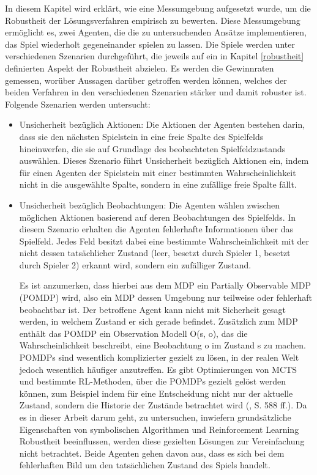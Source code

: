 In diesem Kapitel wird erklärt, wie eine Messumgebung aufgesetzt wurde, um die Robustheit
der Lösungsverfahren empirisch zu bewerten. Diese Messumgebung ermöglicht es, zwei Agenten, die die zu untersuchenden Ansätze implementieren, das Spiel wiederholt gegeneinander spielen zu lassen. Die Spiele werden unter verschiedenen Szenarien durchgeführt, die jeweils auf ein in Kapitel \ref{robustheit} definierten Aspekt der Robustheit abzielen. Es werden die Gewinnraten gemessen, worüber Aussagen darüber getroffen werden können, welches der beiden Verfahren in den verschiedenen Szenarien stärker und damit robuster ist. Folgende Szenarien werden untersucht:

\begin{itemize}
	\item Unsicherheit bezüglich Aktionen: Die Aktionen der Agenten bestehen darin, dass sie den nächsten Spielstein in eine freie Spalte des Spielfelds hineinwerfen, die sie auf Grundlage des beobachteten Spielfeldzustands auswählen. Dieses Szenario führt Unsicherheit bezüglich Aktionen ein, indem für einen Agenten der Spielstein mit einer bestimmten Wahrscheinlichkeit nicht in die ausgewählte Spalte, sondern in eine zufällige freie Spalte fällt.
	
	\item Unsicherheit bezüglich Beobachtungen: Die Agenten wählen zwischen möglichen Aktionen basierend auf deren Beobachtungen des Spielfelds. In diesem Szenario erhalten die Agenten fehlerhafte Informationen über das Spielfeld. Jedes Feld besitzt dabei eine bestimmte Wahrscheinlichkeit mit der nicht dessen tatsächlicher Zustand (leer, besetzt durch Spieler 1, besetzt durch Spieler 2) erkannt wird, sondern ein zufälliger Zustand.
	
	Es ist anzumerken, dass hierbei aus dem MDP ein Partially Observable MDP (POMDP) wird, also ein MDP dessen Umgebung nur teilweise oder fehlerhaft beobachtbar ist. Der betroffene Agent kann nicht mit Sicherheit gesagt werden, in welchem Zustand er sich gerade befindet. Zusätzlich zum MDP enthält das POMDP ein Observation Modell O(s, o), das die Wahrscheinlichkeit beschreibt, eine Beobachtung o im Zustand s zu machen. POMDPs sind wesentlich komplizierter gezielt zu lösen, in der realen Welt jedoch wesentlich häufiger anzutreffen. Es gibt Optimierungen von MCTS und bestimmte RL-Methoden, über die POMDPs gezielt gelöst werden können, zum Beispiel indem für eine Entscheidung nicht nur der aktuelle Zustand, sondern die Historie der Zustände betrachtet wird (\cite{Russell.2020}, S. 588 ff.). Da es in dieser Arbeit darum geht, zu untersuchen, inwiefern grundsätzliche Eigenschaften von symbolischen Algorithmen und Reinforcement Learning Robustheit beeinflussen, werden diese gezielten Lösungen zur Vereinfachung nicht betrachtet. Beide Agenten gehen davon aus, dass es sich bei dem fehlerhaften Bild um den tatsächlichen Zustand des Spiels handelt.
	

\end{itemize}
